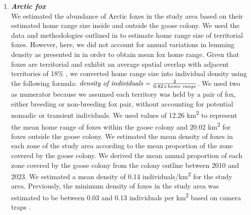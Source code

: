 \documentclass[a4paper,twoside,12pt]{article}
\begin{document}
\begin{enumerate}[label=\alph*.]
                \item[] \textit{\textbf{Arctic fox}}\\
                We estimated the abundance of Arctic foxes in the study area based on their estimated home range size inside and outside the goose colony. We used the data and methodologies outlined in \citet{dulude2023} to estimate home range size of territorial foxes. However, here, we did not account for annual variations in lemming density as presented in \citet{dulude2023} in order to obtain mean fox home range. Given that foxes are territorial and exhibit an average spatial overlap with adjacent territories of 18\% \citep{clermont2021}, we converted home range size into individual density using the following formula: $\text{\textit{density of individuals}}= \frac{2}{0.82\times \text{\textit{home range}}}$. We used two as numerator because we assumed each territory was held by a pair of fox, either breeding or non-breeding fox pair, without accounting for potential nomadic or transient individuals. We used values of 12.26 km\textsuperscript{2} to represent the mean home range of foxes within the goose colony and 20.02 km\textsuperscript{2} for foxes outside the goose colony. We estimated the mean density of foxes in each zone of the study area according to the mean proportion of the zone covered by the goose colony. We derived the mean annual proportion of each zone covered by the goose colony from the colony outline between 2010 and 2023. We estimated a mean density of 0.14 individuals/km\textsuperscript{2} for the study area. Previously, the minimum density of foxes in the study area was estimated to be between 0.03 and 0.13 individuals per km\textsuperscript{2} based on camera traps \citep{royerboutin2015}. 
                \newpage
                        \end{enumerate}
                        
\end{document}
